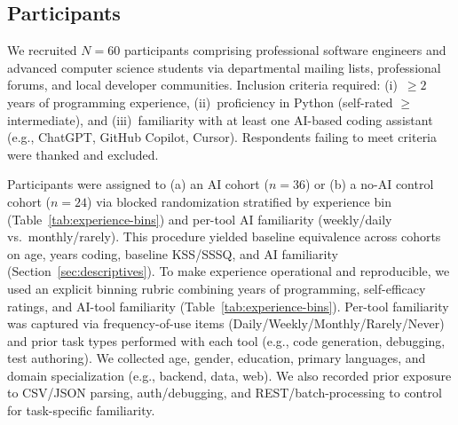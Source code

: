 \documentclass[sigconf]{acmart}
\begin{document}
\subsection{Participants}
\label{sec:participants}

We recruited $N=60$ participants comprising professional software engineers and advanced computer science students via departmental mailing lists, professional forums, and local developer communities. Inclusion criteria required: (i)~$\geq 2$ years of programming experience, (ii)~proficiency in Python (self-rated $\geq$ intermediate), and (iii)~familiarity with at least one AI-based coding assistant (e.g., ChatGPT, GitHub Copilot, Cursor). Respondents failing to meet criteria were thanked and excluded.

\begin{table}[t]
  \centering
  \caption{Experience bin rubric used for stratification and moderator analysis. Self-efficacy and AI familiarity were measured on 5-point Likert scales (1=low, 5=high).}
  \label{tab:experience-bins}
\end{table}

Participants were assigned to (a) an AI cohort ($n=36$) or (b) a no-AI control cohort ($n=24$) via blocked randomization stratified by experience bin (Table~\ref{tab:experience-bins}) and per-tool AI familiarity (weekly/daily vs.\ monthly/rarely). This procedure yielded baseline equivalence across cohorts on age, years coding, baseline KSS/SSSQ, and AI familiarity (Section~\ref{sec:descriptives}). To make experience operational and reproducible, we used an explicit binning rubric combining years of programming, self-efficacy ratings, and AI-tool familiarity (Table~\ref{tab:experience-bins}). Per-tool familiarity was captured via frequency-of-use items (Daily/Weekly/Monthly/Rarely/Never) and prior task types performed with each tool (e.g., code generation, debugging, test authoring). We collected age, gender, education, primary languages, and domain specialization (e.g., backend, data, web). We also recorded prior exposure to CSV/JSON parsing, auth/debugging, and REST/batch-processing to control for task-specific familiarity.
\end{document}
